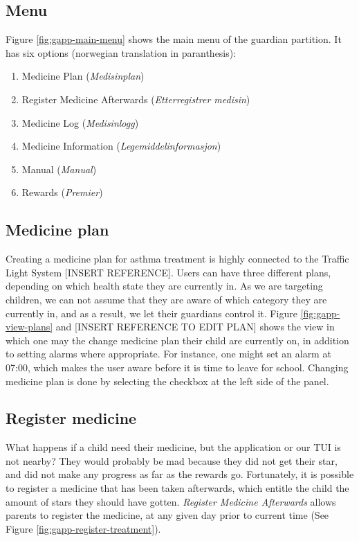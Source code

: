 \subsection{Menu}
\label{sec:description-menu}
Figure \ref{fig:gapp-main-menu} shows the main menu of the guardian partition. It has six options (norwegian translation in paranthesis):
\begin{enumerate}
  \item Medicine Plan (\emph{Medisinplan})
  \item Register Medicine Afterwards (\emph{Etterregistrer medisin})
  \item Medicine Log (\emph{Medisinlogg})
  \item Medicine Information (\emph{Legemiddelinformasjon})
  \item Manual (\emph{Manual})
  \item Rewards (\emph{Premier})
\end{enumerate} 


\subsection{Medicine plan}
\label{sec:description-medicine-plan}
Creating a medicine plan for asthma treatment is highly connected to the Traffic Light System [INSERT REFERENCE].
Users can have three different plans, depending on which health state they are currently in. As we are targeting children, we can not assume that they are aware of which category they are currently in, and as a result, we let their guardians control it. Figure \ref{fig:gapp-view-plans} and [INSERT REFERENCE TO EDIT PLAN] shows the view in which one may the change medicine plan their child are currently on, in addition to setting alarms where appropriate. For instance, one might set an alarm at 07:00, which makes the user aware before it is time to leave for school. Changing medicine plan is done by selecting the checkbox at the left side of the panel.  

\subsection{Register medicine}
\label{sec:description-register-medicine}
What happens if a child need their medicine, but the application or our TUI is not nearby? They would probably be mad because they did not get their star, and did not make any progress as far as the rewards go. Fortunately, it is possible to register a medicine that has been taken afterwards, which entitle the child the amount of stars they should have gotten. \emph{Register Medicine Afterwards} allows parents to register the medicine, at any given day prior to current time (See Figure \ref{fig:gapp-register-treatment}).  


